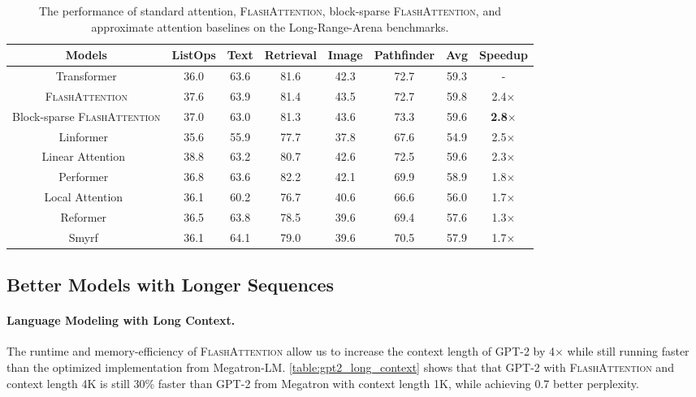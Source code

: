 \documentclass{article}
\newcommand{\sysname}{\textsc{FlashAttention}\xspace}
\begin{document}
\begin{table}[h]
\captionsetup{font=small}
  \vspace{-1em}
    \caption{The performance of standard attention, \sysname, block-sparse
      \sysname, and approximate attention baselines on the Long-Range-Arena benchmarks.}
	\centering
	\small
  \iftoggle{arxiv}{}{
    \resizebox{0.9\linewidth}{!}
  }
  {
	\begin{tabular}{c|ccccc|c|c}
  Models & ListOps & Text & Retrieval & Image & Pathfinder & Avg & Speedup \\
	\hline
	Transformer & 36.0 & 63.6 & 81.6 & 42.3 & 72.7 & 59.3 & - \\
  \sysname & 37.6 & 63.9 & 81.4 & 43.5 & 72.7 & 59.8 & 2.4$\times$ \\
  Block-sparse \sysname & 37.0 & 63.0 & 81.3 & 43.6 & 73.3 & 59.6 & \textbf{2.8$\times$} \\
	\cline{1-8}
	\hline
  Linformer~\citep{wang2020linformer} & 35.6 & 55.9 & 77.7 & 37.8 & 67.6 & 54.9 & 2.5$\times$ \\
  Linear Attention~\citep{katharopoulos2020transformers} & 38.8 & 63.2 & 80.7 & 42.6 & 72.5 & 59.6 & 2.3$\times$ \\
  Performer~\citep{choromanski2020rethinking} & 36.8 & 63.6 & 82.2 & 42.1 & 69.9 & 58.9 & 1.8$\times$ \\
  Local Attention~\citep{tay2020long} & 36.1 & 60.2 & 76.7 & 40.6 & 66.6 & 56.0 & 1.7$\times$ \\
  Reformer~\citep{kitaev2020reformer} & 36.5 & 63.8 & 78.5 & 39.6 & 69.4 & 57.6 & 1.3$\times$  \\
  Smyrf~\citep{daras2020smyrf} & 36.1 & 64.1 & 79.0 & 39.6 & 70.5 & 57.9 & 1.7$\times$ \\
	\end{tabular}
  }
	\label{table:lra}
	\vspace{-1em}
\end{table}

\subsection{Better Models with Longer Sequences}
\label{ssec:exp_long_sequences}

\paragraph{Language Modeling with Long Context.}
The runtime and memory-efficiency of \sysname allow us to increase the context length of
GPT-2 by 4$\times$ while still running faster than the optimized
implementation from Megatron-LM.
\cref{table:gpt2_long_context} shows that that GPT-2 with \sysname and
context length 4K is still 30\% faster than GPT-2 from Megatron with context
length 1K, while achieving 0.7 better perplexity.
\end{document}
